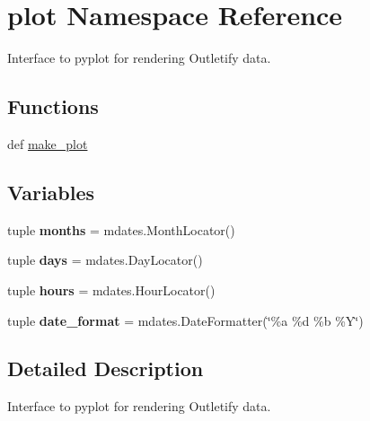 \hypertarget{namespaceplot}{\section{plot Namespace Reference}
\label{namespaceplot}
}


Interface to pyplot for rendering Outletify data.  


\subsection*{Functions}
\begin{DoxyCompactItemize}
\item 
def \hyperlink{namespaceplot_acf0f86ae67fbdf40b58be444c16c608e}{make\-\_\-plot}
\end{DoxyCompactItemize}
\subsection*{Variables}
\begin{DoxyCompactItemize}
\item 
\hypertarget{namespaceplot_ad05dd658da1dd0f7171d12edd852ff72}{tuple {\bfseries months} = mdates.\-Month\-Locator()}\label{namespaceplot_ad05dd658da1dd0f7171d12edd852ff72}

\item 
\hypertarget{namespaceplot_ac3c4efa89edbe9d36ec669ed09e511c4}{tuple {\bfseries days} = mdates.\-Day\-Locator()}\label{namespaceplot_ac3c4efa89edbe9d36ec669ed09e511c4}

\item 
\hypertarget{namespaceplot_a843309f7bd474366b35f8e6d91fccd4d}{tuple {\bfseries hours} = mdates.\-Hour\-Locator()}\label{namespaceplot_a843309f7bd474366b35f8e6d91fccd4d}

\item 
\hypertarget{namespaceplot_a7e0b13d968edf30c2b6c00693bc64a8b}{tuple {\bfseries date\-\_\-format} = mdates.\-Date\-Formatter(\char`\"{}\%a \%d \%b \%Y\char`\"{})}\label{namespaceplot_a7e0b13d968edf30c2b6c00693bc64a8b}

\end{DoxyCompactItemize}


\subsection{Detailed Description}
Interface to pyplot for rendering Outletify data. 

